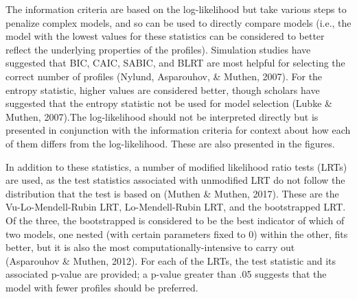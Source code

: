 \documentclass[]{msu-thesis}
\theoremstyle{definition}
\theoremstyle{definition}
\theoremstyle{definition}
\theoremstyle{remark}
\begin{document}
The information criteria are based on the log-likelihood but take
various steps to penalize complex models, and so can be used to directly
compare models (i.e., the model with the lowest values for these
statistics can be considered to better reflect the underlying properties
of the profiles). Simulation studies have suggested that BIC, CAIC,
SABIC, and BLRT are most helpful for selecting the correct number of
profiles (Nylund, Asparouhov, \& Muthen, 2007). For the entropy
statistic, higher values are considered better, though scholars have
suggested that the entropy statistic not be used for model selection
(Lubke \& Muthen, 2007).The log-likelihood should not be interpreted
directly but is presented in conjunction with the information criteria
for context about how each of them differs from the log-likelihood.
These are also presented in the figures.

In addition to these statistics, a number of modified likelihood ratio
tests (LRTs) are used, as the test statistics associated with unmodified
LRT do not follow the distribution that the test is based on (Muthen \&
Muthen, 2017). These are the Vu-Lo-Mendell-Rubin LRT, Lo-Mendell-Rubin
LRT, and the bootstrapped LRT. Of the three, the bootstrapped is
considered to be the best indicator of which of two models, one nested
(with certain parameters fixed to 0) within the other, fits better, but
it is also the most computationally-intensive to carry out (Asparouhov
\& Muthen, 2012). For each of the LRTs, the test statistic and its
associated p-value are provided; a p-value greater than .05 suggests
that the model with fewer profiles should be preferred.
\end{document}
